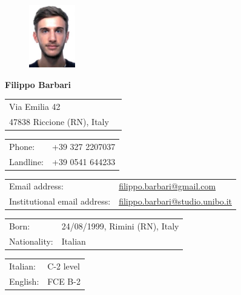 \documentclass[curriculum-vitae-eng]{subfiles}
\begin{document}
	\begin{figure}
		\includegraphics[width=0.18\textwidth]{fototessera}
	\end{figure}
	
	{\LARGE\bfseries Filippo Barbari} %
	\bigskip
	
	\begin{tabular}{ll}
		Via Emilia 42 & \\
		47838 Riccione (RN), Italy & \\
	\end{tabular}
	\medskip
	
	\begin{tabular}{ll}
		Phone: & +39 327 2207037\\
		Landline: & +39 0541 644233
	\end{tabular}
	\medskip
	
	\begin{tabular}{ll}
		Email address: & \href{mailto:filippo.barbari@gmail.com}{filippo.barbari@gmail.com}\\
		Institutional email address: & \href{mailto:filippo.barbari@studio.unibo.it}{filippo.barbari@studio.unibo.it}
	\end{tabular}
	\medskip
	
	\begin{tabular}{ll}
		Born: & 24/08/1999, Rimini (RN), Italy\\ %
		Nationality: & Italian %
	\end{tabular}
	\medskip
	
	\begin{tabular}{ll}
		Italian: & C-2 level\\
		English: & FCE B-2
	\end{tabular}
\end{document}
